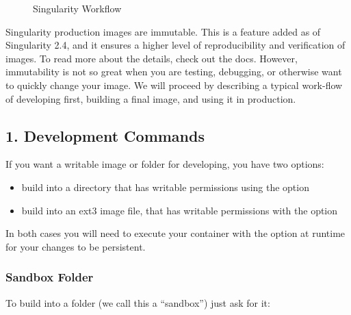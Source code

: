 \documentclass[letterpaper,10pt,english]{sphinxmanual}
\begin{document}
\begin{figure}[htbp]
\centering
\capstart

\noindent{}
\caption{Singularity Workflow}\label{\detokenize{singularity_flow:id2}}\end{figure}

Singularity production images are immutable. This is a feature added as
of Singularity 2.4, and it ensures a higher level of reproducibility and
verification of images. To read more about the details, check out the {\hyperref[\detokenize{build_a_container:build-a-container}]{}}
docs. However, immutability is not so great when you are testing,
debugging, or otherwise want to quickly change your image. We will
proceed by describing a typical work-flow of developing first, building a
final image, and using it in production.


\subsection{1. Development Commands}
\label{\detokenize{singularity_flow:development-commands}}
If you want a writable image or folder for developing, you have two
options:
\begin{itemize}
\item {} 
build into a directory that has writable permissions using the  option

\item {} 
build into an ext3 image file, that has writable permissions with the 
option

\end{itemize}

In both cases you will need to execute your container with the  option at
runtime for your changes to be persistent.


\subsubsection{Sandbox Folder}
\label{\detokenize{singularity_flow:sandbox-folder}}
To build into a folder (we call this a “sandbox”) just ask for it:
\end{document}
